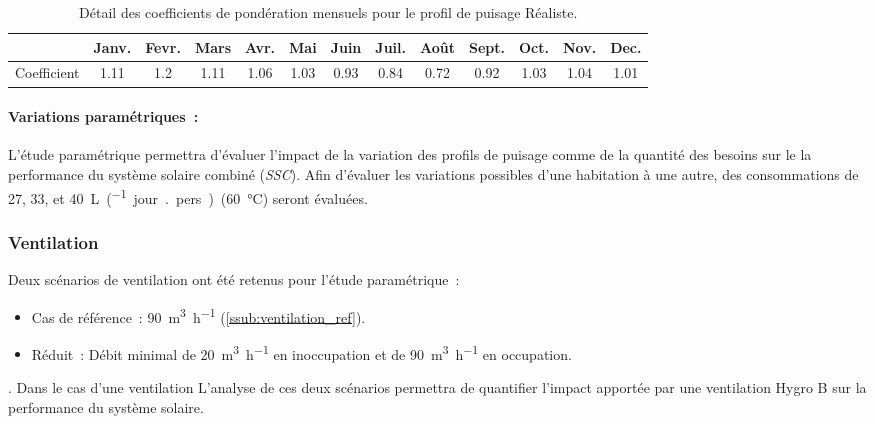 \begin{table}
\centering
\begin{tabular}{l*{12}{c}}
    \toprule
                & Janv. & Fevr. & Mars & Avr. & Mai & Juin & Juil. & Août & Sept. & Oct. & Nov. & Dec. \\
    \midrule
    Coefficient & 1.11   & 1.2   & 1.11  & 1.06  & 1.03  & 0.93   & 0.84    & 0.72   & 0.92    & 1.03  & 1.04  & 1.01  \\
    \bottomrule
\end{tabular}
\caption{Détail des coefficients de pondération mensuels pour le profil de
         puisage Réaliste.}
         \label{tab:coef_mois}
\end{table}

\paragraph{Variations paramétriques~:} %
\label{par:variations_parametriques}
L’étude paramétrique permettra d’évaluer l’impact de la variation des profils de puisage
comme de la quantité des besoins sur le la performance du système solaire combiné
(\emph{SSC}). Afin d’évaluer les variations possibles d’une habitation à une autre, des
consommations de 27, 33, et \SI{40}{\liter\per(jour {.} pers)}~(\SI{60}{\celsius}) seront évaluées.


\subsubsection{Ventilation} %
\label{ssub:ventilation}

Deux scénarios de ventilation ont été retenus pour l’étude paramétrique~:
\begin{itemize}
    \item Cas de référence~: \SI{90}{\meter\cubed\per\hour} (\ref{ssub:ventilation_ref}).
    \item Réduit~: Débit minimal de \SI{20}{\meter\cubed\per\hour} en inoccupation et de
          \SI{90}{\meter\cubed\per\hour} en occupation.
\end{itemize}. Dans le cas d’une ventilation
L’analyse de ces deux scénarios permettra de quantifier l’impact apportée par une
ventilation Hygro B sur la performance du système solaire.


